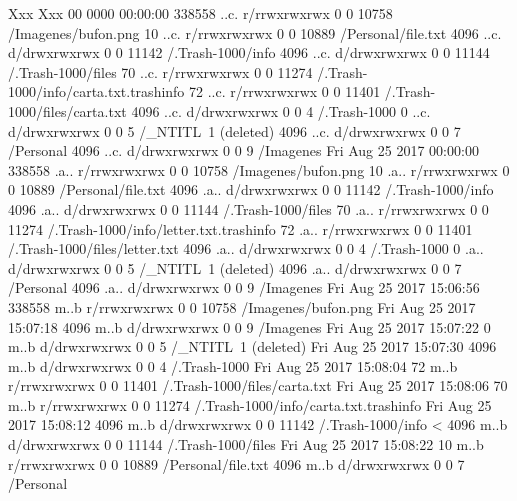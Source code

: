 \begin{terminal}[caption=Haxe python transcompilation command, label=L:tsk-timeline]
%
%
Xxx Xxx 00 0000 00:00:00   338558 ..c. r/rrwxrwxrwx 0        0        10758    /Imagenes/bufon.png
         10 ..c. r/rrwxrwxrwx 0        0        10889    /Personal/file.txt
       4096 ..c. d/drwxrwxrwx 0        0        11142    /.Trash-1000/info
       4096 ..c. d/drwxrwxrwx 0        0        11144    /.Trash-1000/files
         70 ..c. r/rrwxrwxrwx 0        0        11274    /.Trash-1000/info/carta.txt.trashinfo
         72 ..c. r/rrwxrwxrwx 0        0        11401    /.Trash-1000/files/carta.txt
       4096 ..c. d/drwxrwxrwx 0        0        4        /.Trash-1000
          0 ..c. d/drwxrwxrwx 0        0        5        /_NTITL~1 (deleted)
       4096 ..c. d/drwxrwxrwx 0        0        7        /Personal
       4096 ..c. d/drwxrwxrwx 0        0        9        /Imagenes
Fri Aug 25 2017 00:00:00   338558 .a.. r/rrwxrwxrwx 0        0        10758    /Imagenes/bufon.png
         10 .a.. r/rrwxrwxrwx 0        0        10889    /Personal/file.txt
       4096 .a.. d/drwxrwxrwx 0        0        11142    /.Trash-1000/info
       4096 .a.. d/drwxrwxrwx 0        0        11144    /.Trash-1000/files
         70 .a.. r/rrwxrwxrwx 0        0        11274    /.Trash-1000/info/letter.txt.trashinfo
         72 .a.. r/rrwxrwxrwx 0        0        11401    /.Trash-1000/files/letter.txt
       4096 .a.. d/drwxrwxrwx 0        0        4        /.Trash-1000
          0 .a.. d/drwxrwxrwx 0        0        5        /_NTITL~1 (deleted)
       4096 .a.. d/drwxrwxrwx 0        0        7        /Personal
       4096 .a.. d/drwxrwxrwx 0        0        9        /Imagenes
Fri Aug 25 2017 15:06:56   338558 m..b r/rrwxrwxrwx 0        0        10758    /Imagenes/bufon.png
Fri Aug 25 2017 15:07:18     4096 m..b d/drwxrwxrwx 0        0        9        /Imagenes
Fri Aug 25 2017 15:07:22        0 m..b d/drwxrwxrwx 0        0        5        /_NTITL~1 (deleted)
Fri Aug 25 2017 15:07:30     4096 m..b d/drwxrwxrwx 0        0        4        /.Trash-1000
Fri Aug 25 2017 15:08:04       72 m..b r/rrwxrwxrwx 0        0        11401    /.Trash-1000/files/carta.txt
Fri Aug 25 2017 15:08:06       70 m..b r/rrwxrwxrwx 0        0        11274    /.Trash-1000/info/carta.txt.trashinfo
Fri Aug 25 2017 15:08:12     4096 m..b d/drwxrwxrwx 0        0        11142    /.Trash-1000/info
< 4096 m..b d/drwxrwxrwx 0        0        11144    /.Trash-1000/files
Fri Aug 25 2017 15:08:22       10 m..b r/rrwxrwxrwx 0        0        10889    /Personal/file.txt
       4096 m..b d/drwxrwxrwx 0        0        7        /Personal

\end{terminal}


